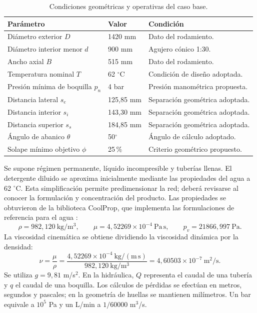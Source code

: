 \begin{table}[htbp]
\centering\small
\caption{Condiciones geométricas y operativas del caso base.}
\label{tab:man-asp-base}
\begin{tabularx}{\linewidth}{@{}>{\raggedright\arraybackslash}X l >{\raggedright\arraybackslash}p{4.1cm}@{}}
\toprule Parámetro & Valor & Condición\\\midrule
Diámetro exterior $D$ & 1420 mm & Dato del rodamiento.\\
Diámetro interior menor $d$ & 900 mm & Agujero cónico 1:30.\\
Ancho axial $B$ & 515 mm & Dato del rodamiento.\\
Temperatura nominal $T$ & 62 $^\circ$C & Condición de diseño adoptada.\\
Presión mínima de boquilla $p_n$ & 4 bar & Presión manométrica propuesta.\\
Distancia lateral $s_e$ & 125,85 mm & Separación geométrica adoptada.\\
Distancia interior $s_i$ & 143,30 mm & Separación geométrica adoptada.\\
Distancia superior $s_s$ & 184,85 mm & Separación geométrica adoptada.\\
Ángulo de abanico $\theta$ & 50$^\circ$ & Ángulo de cálculo adoptado.\\
Solape mínimo objetivo $\phi$ & 25\,\% & Criterio geométrico propuesto.\\
\bottomrule
\end{tabularx}
\end{table}

Se supone régimen permanente, líquido incompresible y tuberías llenas.
El detergente diluido se aproxima inicialmente mediante las propiedades
del agua a 62 $^\circ$C. Esta simplificación permite predimensionar la red;
deberá revisarse al conocer la formulación y concentración del producto.
Las propiedades se obtuvieron de la biblioteca CoolProp, que implementa
las formulaciones de referencia para el agua \cite{bell2014}:
\begin{equation}
 \rho=982{,}120\ \mathrm{kg/m^3},\qquad
 \mu=4{,}52269\times10^{-4}\ \mathrm{Pa\,s},\qquad
 p_v=21866{,}997\ \mathrm{Pa}.
 \label{eq:man-asp-props}
\end{equation}
La viscosidad cinemática se obtiene dividiendo la viscosidad dinámica por
la densidad:
\begin{equation}
 \nu=\frac{\mu}{\rho}
 =\frac{4{,}52269\times10^{-4}\ \mathrm{kg/(m\,s)}}
 {982{,}120\ \mathrm{kg/m^3}}
 =4{,}60503\times10^{-7}\ \mathrm{m^2/s}.
 \label{eq:man-asp-nu}
\end{equation}
Se utiliza $g=9{,}81$ m/s$^2$. En la hidráulica, $Q$ representa el caudal
de una tubería y $q$ el caudal de una boquilla. Los cálculos de pérdidas
se efectúan en metros, segundos y pascales; en la geometría de huellas
se mantienen milímetros. Un bar equivale a $10^5$ Pa y un L/min a
$1/60000$ m$^3$/s.

